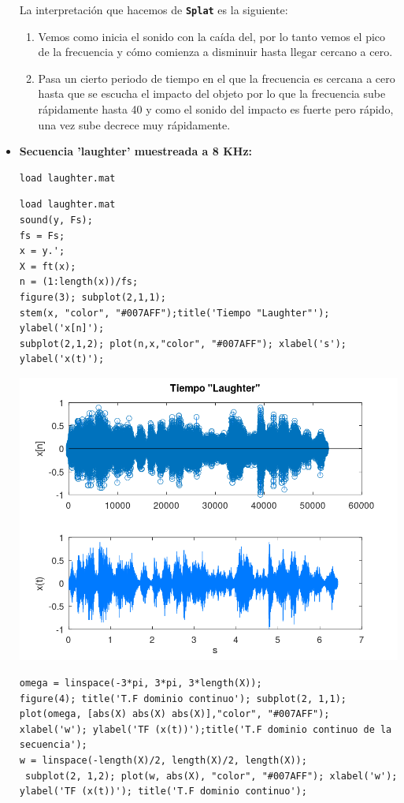 \documentclass{article}
\newcommand{\code}[1]{\texttt{\textbf{#1}}}
\begin{document}
\begin{itemize}
La interpretación que hacemos de \code{Splat} es la siguiente:
\begin{enumerate}[label=\arabic*)]
	\item Vemos como inicia el sonido con la caída del, por lo tanto vemos el pico de la frecuencia y cómo comienza  a disminuir hasta llegar cercano a cero.
	\item Pasa un cierto periodo de tiempo en el que la frecuencia es cercana a cero hasta que se escucha el impacto del objeto por lo que la frecuencia sube rápidamente hasta 40 y como el sonido del impacto es fuerte pero rápido, una vez sube decrece muy rápidamente.
\end{enumerate}

\item \textbf{Secuencia 'laughter' muestreada a 8 KHz:}
\begin{lstlisting}
load laughter.mat
\end{lstlisting}

\begin{lstlisting}
load laughter.mat
sound(y, Fs);
fs = Fs;
x = y.';
X = ft(x);
n = (1:length(x))/fs;
figure(3); subplot(2,1,1);
stem(x, "color", "#007AFF");title('Tiempo "Laughter"'); ylabel('x[n]');
subplot(2,1,2); plot(n,x,"color", "#007AFF"); xlabel('s'); ylabel('x(t)');
\end{lstlisting}

\begin{center}
\includegraphics[width=0.7\linewidth]{Imágenes/Figura3}
\end{center}

\begin{lstlisting}
omega = linspace(-3*pi, 3*pi, 3*length(X));
figure(4); title('T.F dominio continuo'); subplot(2, 1,1);
plot(omega, [abs(X) abs(X) abs(X)],"color", "#007AFF"); xlabel('w'); ylabel('TF (x(t))');title('T.F dominio continuo de la secuencia');
w = linspace(-length(X)/2, length(X)/2, length(X));
 subplot(2, 1,2); plot(w, abs(X), "color", "#007AFF"); xlabel('w'); ylabel('TF (x(t))'); title('T.F dominio continuo');
\end{lstlisting}


\end{itemize}
\end{document}
